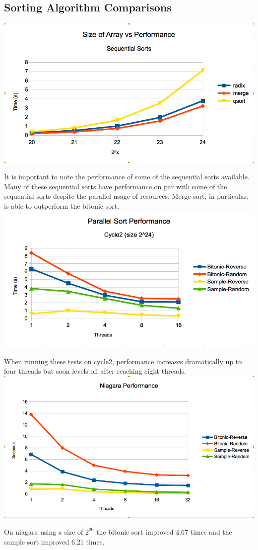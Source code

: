 \documentclass[11pt,letterpaper]{article}
\begin{document}
\subsection{Sorting Algorithm Comparisons}
\includegraphics[width=\textwidth]{sequential-performance.png}
\par
It is important to note the performance of some of the sequential sorts available.  Many of these sequential sorts have performance on par with some of the sequential sorts despite the parallel usage of resources.  Merge sort, in particular, is able to outperform the bitonic sort.
\includegraphics[width=\textwidth]{cycle2-performance.png}
\par When running these tests on cycle2, performance increases dramatically up to four threads but soon levels off after reaching eight threads.\\
\includegraphics[width=\textwidth]{niagara-performance.png}
\par
On niagara using a size of $2^20$ the bitonic sort improved 4.67 times and the sample sort improved 6.21 times.
\end{document}
